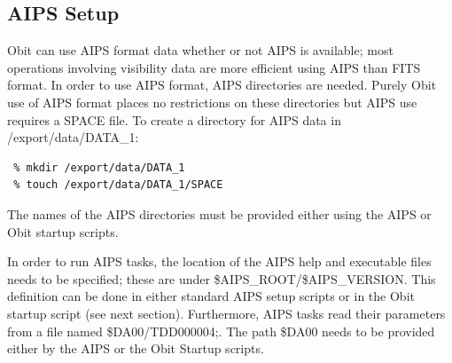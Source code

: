 \documentclass[11pt]{report}
\begin{document}
\subsection{AIPS Setup}
Obit can use AIPS format data whether or not AIPS is available; most
operations involving visibility data are more efficient using AIPS
than FITS format.
In order to use AIPS format, AIPS directories are needed.
Purely Obit use of AIPS format places no restrictions on these
directories but AIPS use requires a SPACE file.
To create a directory for AIPS data in /export/data/DATA\_1:
\begin{verbatim}
 % mkdir /export/data/DATA_1
 % touch /export/data/DATA_1/SPACE
\end{verbatim}
The names of the AIPS directories must be provided either using the
AIPS or Obit startup scripts.

In order to run AIPS tasks, the location of the AIPS help and
executable files needs to be specified; these are under
\$AIPS\_ROOT/\$AIPS\_VERSION. 
This definition can be done in either standard AIPS setup scripts or
in the Obit startup script (see next section).
Furthermore, AIPS tasks read their parameters from a file named
\$DA00/TDD000004;.
The path \$DA00 needs to be provided either by the AIPS or the Obit
Startup scripts. 
\end{document}
